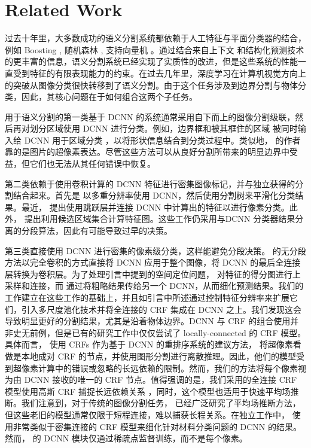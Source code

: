 \section{Related Work}

过去十年里，大多数成功的语义分割系统都依赖于人工特征与平面分类器的结合，例如 Boosting \cite{TuB10,shotton2009textonboost}, 随机森林 \cite{shotton2008semantic}, 支持向量机 \cite{FulkersonVS09}。通过结合来自上下文 \cite{carreira2012semantic} 和结构化预测技术 \cite{he2004multiscale,ladicky2009associative,carreira2012cpmc,krahenbuhl2011efficient} 的更丰富的信息，语义分割系统已经实现了实质性的改进，但是这些系统的性能一直受到特征的有限表现能力的约束。在过去几年里，深度学习在计算机视觉方向上的突破从图像分类很快转移到了语义分割。由于这个任务涉及到边界分割与物体分类，因此，其核心问题在于如何组合这两个子任务。

用于语义分割的第一类基于 DCNN 的系统通常采用自下而上的图像分割级联，然后再对划分区域使用 DCNN 进行分类。例如，边界框和被其框住的区域 \cite{arbelaez2014multiscale, Uijlings13} 被同时输入给 DCNN 用于区域分类 \cite{girshick2014rcnn, hariharan2014simultaneous}，以将形状信息结合到分类过程中。类似地，\cite{mostajabi2014feedforward} 的作者靠的是图片的超像素表达。尽管这些方法可以从良好分割所带来的明显边界中受益，但它们也无法从其任何错误中恢复。

第二类依赖于使用卷积计算的 DCNN 特征进行密集图像标记，并与独立获得的分割结合起来。首先是 \cite{farabet2013learning} 以多重分辨率使用 DCNN，然后使用分割树来平滑化分类结果。最近，\cite{hariharan2014hypercolumns} 提出使用跳跃层并连接 DCNN 中计算出的特征以进行像素分类。此外，\cite{dai2014convolutional} 提出利用候选区域集合计算特征图。这些工作仍采用与DCNN 分类器结果分离的分段算法，因此有可能导致过早的决策。

第三类直接使用 DCNN 进行密集的像素级分类，这样能避免分段决策。\cite{long2014fully, eigen2014predicting} 的无分段方法以完全卷积的方式直接将 DCNN 应用于整个图像，将 DCNN 的最后全连接层转换为卷积层。为了处理引言中提到的空间定位问题，\cite{long2014fully} 对特征的得分图进行上采样和连接，而 \cite{eigen2014predicting} 通过将粗略结果传给另一个 DCNN，从而细化预测结果。我们的工作建立在这些工作的基础上，并且如引言中所述通过控制特征分辨率来扩展它们，引入多尺度池化技术并将全连接的 CRF \cite{krahenbuhl2011efficient} 集成在 DCNN 之上。我们发现这会导致明显更好的分割结果，尤其是沿着物体边界。DCNN 与 CRF 的组合使用并非史无前例，但是已有的研究工作中仅仅尝试了 locally-connected 的 CRF 模型。具体而言，\cite{cogswell2014combining} 使用 CRFs 作为基于 DCNN 的重排序系统的建议方法，\cite{farabet2013learning} 将超像素看做是本地成对 CRF 的节点，并使用图形分割进行离散推理。因此，他们的模型受到超像素计算中的错误或忽略的长远依赖的限制。然而，我们的方法将每个像素视为由 DCNN 接收的唯一的 CRF 节点。值得强调的是，我们采用的全连接 CRF 模型使用高斯 CRF 捕捉长远依赖关系 \cite{krahenbuhl2011efficient}，同时，这个模型也适用于快速平均场推断。我们注意到，对于传统的图像分割任务，\cite{geiger1991parallel, geiger1991common, kokkinos2008computational} 已经广泛研究了平均场推断方法，但这些老旧的模型通常仅限于短程连接，难以捕获长程关系。在独立工作中， \cite{bell2014material} 使用非常类似于密集连接的 CRF 模型来细化针对材料分类问题的 DCNN 的结果。然而，\cite{bell2014material} 的 DCNN 模块仅通过稀疏点监督训练，而不是每个像素。

